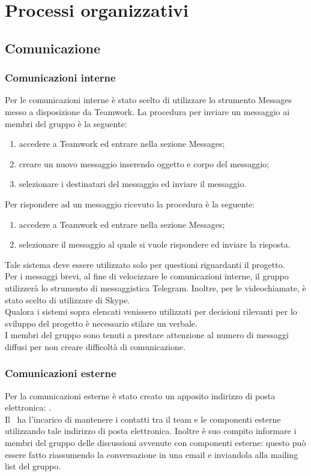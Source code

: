 \documentclass[../NormeProgetto.tex]{subfiles}
\begin{document}
\section{Processi organizzativi}
	\subsection{Comunicazione}
		\subsubsection{Comunicazioni interne}
		Per le comunicazioni interne è stato scelto di utilizzare lo strumento Messages messo a disposizione da Teamwork.
		La procedura per inviare un messaggio ai membri del gruppo è la seguente:
		\begin{enumerate}
			\item accedere a Teamwork ed entrare nella sezione Messages;
			\item creare un nuovo messaggio inserendo oggetto e corpo del messaggio;
			\item selezionare i destinatari del messaggio ed inviare il messaggio.
		\end{enumerate}
		Per rispondere ad un messaggio ricevuto la procedura è la seguente:
		\begin{enumerate}
			\item accedere a Teamwork ed entrare nella sezione Messages;
			\item selezionare il messaggio al quale si vuole rispondere ed inviare la risposta.
		\end{enumerate}
		 Tale sistema deve essere utilizzato solo per questioni riguardanti il progetto. \\
		Per i messaggi brevi, al fine di velocizzare le comunicazioni interne, il gruppo utilizzerà lo strumento di messaggistica Telegram. Inoltre, per le videochiamate, è stato scelto di utilizzare di Skype. \\
		Qualora i sistemi sopra elencati venissero utilizzati per decisioni rilevanti per lo sviluppo del progetto è necessario stilare un verbale.\\
		I membri del gruppo sono tenuti a prestare attenzione al numero di messaggi diffusi per non creare difficoltà di comunicazione. 
		\subsubsection{Comunicazioni esterne}
		Per la comunicazioni esterne è stato creato un apposito indirizzo di posta elettronica: \mailleaf. \\
		Il \responsabilediprogetto\ ha l'incarico di mantenere i contatti tra il team e le componenti esterne utilizzando tale indirizzo di posta elettronica. Inoltre è suo compito informare i membri del gruppo delle discussioni avvenute con componenti esterne: questo può essere fatto riassumendo la conversazione in una email e inviandola alla mailing list del gruppo.
\end{document}

